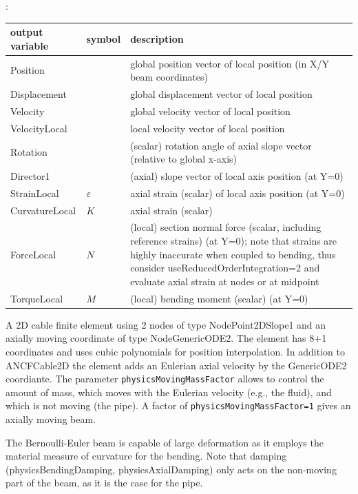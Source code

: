 :
\begin{center}
\footnotesize
\begin{longtable}{| p{5cm} | p{5cm} | p{6cm} |} 
\hline
\bf output variable & \bf symbol & \bf description \\ \hline
Position &  & global position vector of local position (in X/Y beam coordinates)\\ \hline
Displacement &  & global displacement vector of local position\\ \hline
Velocity &  & global velocity vector of local position\\ \hline
VelocityLocal &  & local velocity vector of local position\\ \hline
Rotation &  & (scalar) rotation angle of axial slope vector (relative to global x-axis)\\ \hline
Director1 &  & (axial) slope vector of local axis position (at Y=0)\\ \hline
StrainLocal & $\varepsilon$ & axial strain (scalar) of local axis position (at Y=0)\\ \hline
CurvatureLocal & $K$ & axial strain (scalar)\\ \hline
ForceLocal & $N$ &  (local) section normal force (scalar, including reference strains) (at Y=0); note that strains are highly inaccurate when coupled to bending, thus consider useReducedOrderIntegration=2 and evaluate axial strain at nodes or at midpoint\\ \hline
TorqueLocal & $M$ &  (local) bending moment (scalar) (at Y=0)\\ \hline
\end{longtable}
\end{center}
 \noindent
    A 2D cable finite element using 2 nodes of type NodePoint2DSlope1 and an axially moving coordinate of type NodeGenericODE2.
    The element has 8+1 coordinates and uses cubic polynomials for position interpolation.
    In addition to ANCFCable2D the element adds an Eulerian axial velocity by the GenericODE2 coordiante.
    The parameter \texttt{physicsMovingMassFactor} allows to control the amount of mass, which moves with
    the Eulerian velocity (e.g., the fluid), and which is not moving (the pipe). 
    A factor of \texttt{physicsMovingMassFactor=1} gives an axially moving beam.

    The Bernoulli-Euler beam is capable of large deformation as it employs the material measure of curvature for the bending.
    Note that damping (physicsBendingDamping, physicsAxialDamping) only acts on the non-moving part of the beam, as it is the case for the pipe.
    
